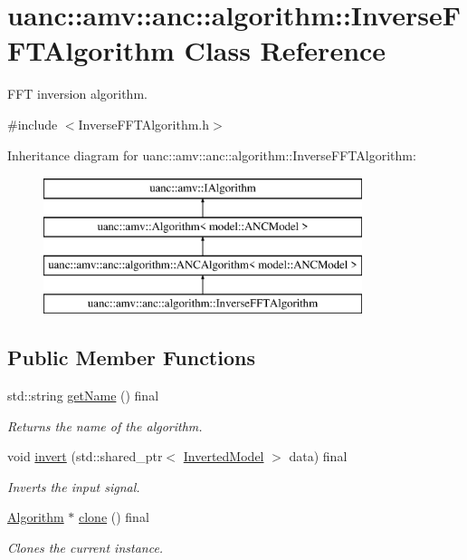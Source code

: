 \hypertarget{classuanc_1_1amv_1_1anc_1_1algorithm_1_1_inverse_f_f_t_algorithm}{}\section{uanc\+:\+:amv\+:\+:anc\+:\+:algorithm\+:\+:Inverse\+F\+F\+T\+Algorithm Class Reference}
\label{classuanc_1_1amv_1_1anc_1_1algorithm_1_1_inverse_f_f_t_algorithm}


F\+FT inversion algorithm.  




{\ttfamily \#include $<$Inverse\+F\+F\+T\+Algorithm.\+h$>$}

Inheritance diagram for uanc\+:\+:amv\+:\+:anc\+:\+:algorithm\+:\+:Inverse\+F\+F\+T\+Algorithm\+:\begin{figure}[H]
\begin{center}
\leavevmode
\includegraphics[height=4.000000cm]{classuanc_1_1amv_1_1anc_1_1algorithm_1_1_inverse_f_f_t_algorithm}
\end{center}
\end{figure}
\subsection*{Public Member Functions}
\begin{DoxyCompactItemize}
\item 
std\+::string \hyperlink{classuanc_1_1amv_1_1anc_1_1algorithm_1_1_inverse_f_f_t_algorithm_a7f412ced258f067f47e865608de16cd6}{get\+Name} () final
\begin{DoxyCompactList}\small\item\em Returns the name of the algorithm. \end{DoxyCompactList}\item 
void \hyperlink{classuanc_1_1amv_1_1anc_1_1algorithm_1_1_inverse_f_f_t_algorithm_a75d38b5ce03bca80a856dfa257f590a4}{invert} (std\+::shared\+\_\+ptr$<$ \hyperlink{classuanc_1_1amv_1_1_inverted_model}{Inverted\+Model} $>$ data) final
\begin{DoxyCompactList}\small\item\em Inverts the input signal. \end{DoxyCompactList}\item 
\hyperlink{classuanc_1_1amv_1_1_algorithm}{Algorithm} $\ast$ \hyperlink{classuanc_1_1amv_1_1anc_1_1algorithm_1_1_inverse_f_f_t_algorithm_abb8ee8a2ba58c14cf2a138657f3cc211}{clone} () final
\begin{DoxyCompactList}\small\item\em Clones the current instance. \end{DoxyCompactList}\end{DoxyCompactItemize}
